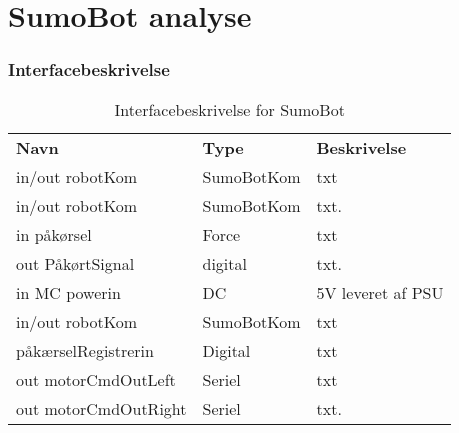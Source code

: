 \section{SumoBot analyse}


\subsubsection{Interfacebeskrivelse}

\begin{table*}[]
\centering
    \caption{Interfacebeskrivelse for SumoBot}
    \label{tab:interface_table_SumoBot}
    \begin{tabular}{lp{5cm}p{7cm}}\toprule
        \textbf{Navn}              & \textbf{Type}                & \textbf{Beskrivelse}                                                                                                            \\
        in/out robotKom      & SumoBotKom                          & txt                                                                                             \\
        in/out robotKom       & SumoBotKom                         & txt.& 
                 \\
        in påkørsel           & Force                               & txt                                                                                             \\
        out PåkørtSignal      & digital                            & txt.&                                                                                              \\
        in MC powerin        & DC                                   & 5V leveret af PSU 
                 \\
        in/out robotKom      & SumoBotKom                          & txt                                                                                              \\
        påkærselRegistrerin  & Digital                             & txt                                                                                              \\
        out motorCmdOutLeft  & Seriel                               & txt 
                 \\
        out motorCmdOutRight & Seriel                              & txt.&                                                                                          \\

\end{tabular}
\end{table*}
